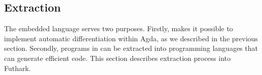 % 
\subsection{Extraction\label{sec:extraction}}

The embedded language  serves two purposes.
Firstly,  makes it possible to implement automatic differentiation
within Agda, as we described in the previous section.
Secondly, programs in  can be extracted into
programming languages that can generate efficient code.  This
section describes extraction process into Futhark.

